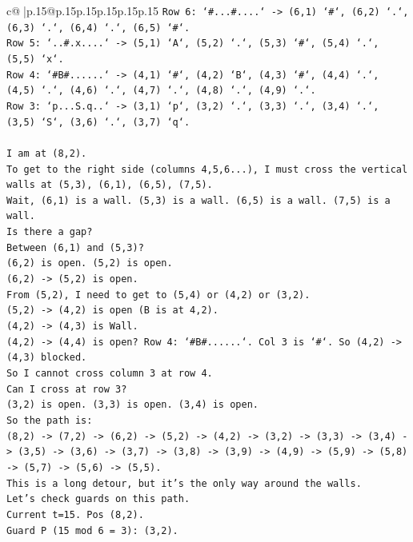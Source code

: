 \documentclass{article}
\begin{document}
{\begin{supertabular}{c@{$\;$}|p{.15\linewidth}@{}p{.15\linewidth}p{.15\linewidth}p{.15\linewidth}p{.15\linewidth}p{.15\linewidth}}
{{{\texttt{Row 6: `\#...\#....` {-}> (6,1) `\#`, (6,2) `.`, (6,3) `.`, (6,4) `.`, (6,5) `\#`.} \\
\texttt{Row 5: `..\#.x....` {-}> (5,1) `A`, (5,2) `.`, (5,3) `\#`, (5,4) `.`, (5,5) `x`.} \\
\texttt{Row 4: `\#B\#......` {-}> (4,1) `\#`, (4,2) `B`, (4,3) `\#`, (4,4) `.`, (4,5) `.`, (4,6) `.`, (4,7) `.`, (4,8) `.`, (4,9) `.`.} \\
\texttt{Row 3: `p...S.q..` {-}> (3,1) `p`, (3,2) `.`, (3,3) `.`, (3,4) `.`, (3,5) `S`, (3,6) `.`, (3,7) `q`.} \\
\\ 
\texttt{I am at (8,2).} \\
\texttt{To get to the right side (columns 4,5,6...), I must cross the vertical walls at (5,3), (6,1), (6,5), (7,5).} \\
\texttt{Wait, (6,1) is a wall. (5,3) is a wall. (6,5) is a wall. (7,5) is a wall.} \\
\texttt{Is there a gap?} \\
\texttt{Between (6,1) and (5,3)?} \\
\texttt{(6,2) is open. (5,2) is open.} \\
\texttt{(6,2) {-}> (5,2) is open.} \\
\texttt{From (5,2), I need to get to (5,4) or (4,2) or (3,2).} \\
\texttt{(5,2) {-}> (4,2) is open (B is at 4,2).} \\
\texttt{(4,2) {-}> (4,3) is Wall.} \\
\texttt{(4,2) {-}> (4,4) is open? Row 4: `\#B\#......`. Col 3 is `\#`. So (4,2) {-}> (4,3) blocked.} \\
\texttt{So I cannot cross column 3 at row 4.} \\
\texttt{Can I cross at row 3?} \\
\texttt{(3,2) is open. (3,3) is open. (3,4) is open.} \\
\texttt{So the path is:} \\
\texttt{(8,2) {-}> (7,2) {-}> (6,2) {-}> (5,2) {-}> (4,2) {-}> (3,2) {-}> (3,3) {-}> (3,4) {-}> (3,5) {-}> (3,6) {-}> (3,7) {-}> (3,8) {-}> (3,9) {-}> (4,9) {-}> (5,9) {-}> (5,8) {-}> (5,7) {-}> (5,6) {-}> (5,5).} \\
\texttt{This is a long detour, but it's the only way around the walls.} \\
\texttt{Let's check guards on this path.} \\
\texttt{Current t=15. Pos (8,2).} \\
\texttt{Guard P (15 mod 6 = 3): (3,2).} \\
}}}
\end{supertabular}}
\end{document}
